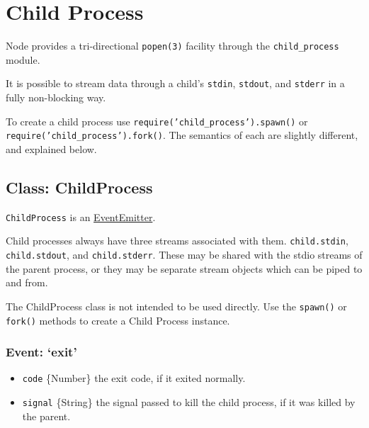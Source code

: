 \section{Child Process}

\begin{Shaded}
\begin{Highlighting}[]
\NormalTok{: } 
\end{Highlighting}
\end{Shaded}

Node provides a tri-directional \texttt{popen(3)} facility through the
\texttt{child\_process} module.

It is possible to stream data through a child's \texttt{stdin},
\texttt{stdout}, and \texttt{stderr} in a fully non-blocking way.

To create a child process use \texttt{require('child\_process').spawn()}
or \texttt{require('child\_process').fork()}. The semantics of each are
slightly different, and explained below.

\subsection{Class: ChildProcess}

\texttt{ChildProcess} is an
\href{events.html\#events\_class\_events\_eventemitter}{EventEmitter}.

Child processes always have three streams associated with them.
\texttt{child.stdin}, \texttt{child.stdout}, and \texttt{child.stderr}.
These may be shared with the stdio streams of the parent process, or
they may be separate stream objects which can be piped to and from.

The ChildProcess class is not intended to be used directly. Use the
\texttt{spawn()} or \texttt{fork()} methods to create a Child Process
instance.

\subsubsection{Event: `exit'}

\begin{itemize}
\item
  \texttt{code} \{Number\} the exit code, if it exited normally.
\item
  \texttt{signal} \{String\} the signal passed to kill the child
  process, if it was killed by the parent.
\end{itemize}

